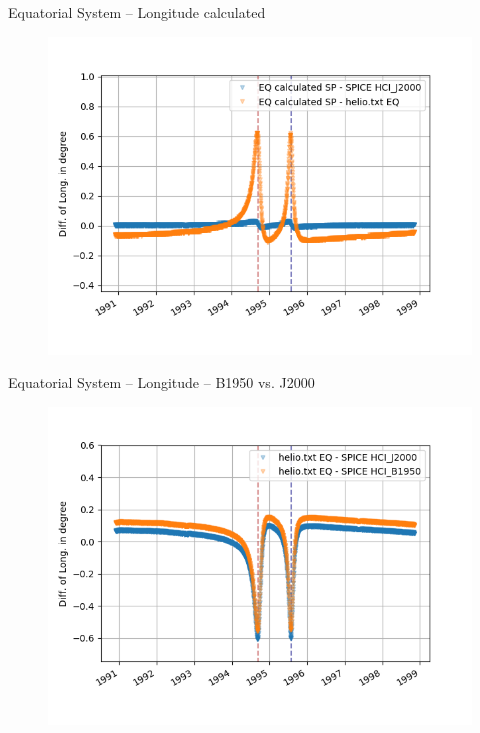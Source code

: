 \documentclass{beamer}
\begin{document}
\begin{frame}{Equatorial System -- Longitude calculated}
\begin{figure}									
	\includegraphics[width=1\textwidth]{Pics/EQ_LONG_CALC.png}
\end{figure}
\end{frame}

\begin{frame}{Equatorial System -- Longitude -- B1950 vs. J2000}
\begin{figure}									
	\includegraphics[width=1\textwidth]{Pics/EQ_LONG_J_B.png}
\end{figure}
\end{frame}
\end{document}
